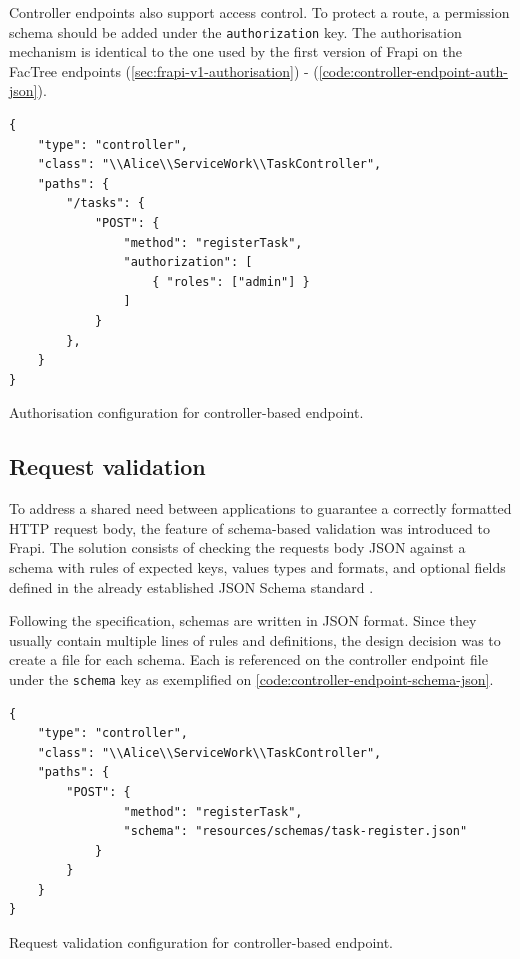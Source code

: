Controller endpoints also support access control. To protect a route, a permission schema should be added under the \texttt{authorization} key. The authorisation mechanism is identical to the one used by the first version of Frapi on the FacTree endpoints (\autoref{sec:frapi-v1-authorisation}) - (\autoref{code:controller-endpoint-auth-json}).

\begin{listing}[htbp]
\begin{verbatim}
{
    "type": "controller",
    "class": "\\Alice\\ServiceWork\\TaskController",
    "paths": {
        "/tasks": {
            "POST": {
	            "method": "registerTask",
	            "authorization": [
                    { "roles": ["admin"] }
                ]
	        }
        },
    }
}
\end{verbatim}
\caption{Authorisation configuration for controller-based endpoint.}
\label{code:controller-endpoint-auth-json}
\end{listing}

\subsection{Request validation}

To address a shared need between applications to guarantee a correctly formatted HTTP request body, the feature of schema-based validation was introduced to Frapi. The solution consists of checking the requests body JSON against a schema with rules of expected keys, values types and formats, and optional fields defined in the already established JSON Schema standard \cite{json-schema-spec}.

Following the specification, schemas are written in JSON format. Since they usually contain multiple lines of rules and definitions, the design decision was to create a file for each schema. Each is referenced on the controller endpoint file under the \texttt{schema} key as exemplified on \autoref{code:controller-endpoint-schema-json}.

\begin{listing}[htbp]
\begin{verbatim}
{
	"type": "controller",
    "class": "\\Alice\\ServiceWork\\TaskController",
    "paths": {
		"POST": {
                "method": "registerTask",
                "schema": "resources/schemas/task-register.json"
            }
        }
    }
}
\end{verbatim}
\caption{Request validation configuration for controller-based endpoint.}
\label{code:controller-endpoint-schema-json}
\end{listing}

